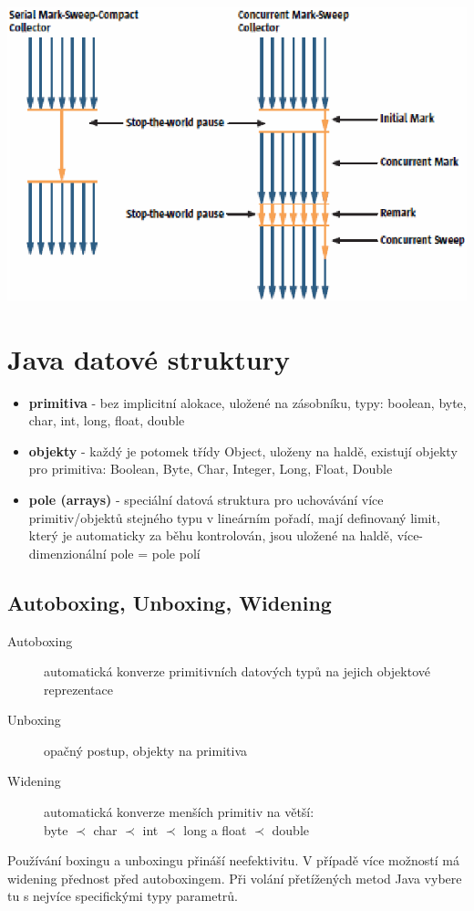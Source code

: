\documentclass{scrreprt}
\begin{document}
\begin{itemize}
\begin{center}
\includegraphics[scale=0.75]{img/gc_concurrent}
\end{center}
\end{itemize}

\section{Java datové struktury}
\begin{itemize}
\item \textbf{primitiva} - bez implicitní alokace, uložené na zásobníku, typy: \textsf{boolean}, \textsf{byte}, \textsf{char}, \textsf{int}, \textsf{long}, \textsf{float}, \textsf{double}
\item \textbf{objekty} - každý je potomek třídy \textsf{Object}, uloženy na haldě, existují objekty pro primitiva: \textsf{Boolean}, \textsf{Byte}, \textsf{Char}, \textsf{Integer}, \textsf{Long}, \textsf{Float}, \textsf{Double}
\item \textbf{pole (arrays)} - speciální datová struktura pro uchovávání více primitiv/objektů stejného typu v lineárním pořadí, mají definovaný limit, který je automaticky za běhu kontrolován, jsou uložené na haldě, více-dimenzionální pole = pole polí
\end{itemize}

\subsection{Autoboxing, Unboxing, Widening}
\begin{description}
\item[Autoboxing] automatická konverze primitivních datových typů na jejich objektové reprezentace
\item[Unboxing] opačný postup, objekty na primitiva
\item[Widening] automatická konverze menších primitiv na větší: \\ \textsf{byte} $\prec$ \textsf{char} $\prec$ \textsf{int} $\prec$ \textsf{long} a \textsf{float} $\prec$ \textsf{double}
\end{description}
Používání boxingu a unboxingu přináší neefektivitu. V případě více možností má widening přednost před autoboxingem. Při volání přetížených metod Java vybere tu s nejvíce specifickými typy parametrů.
\end{document}
